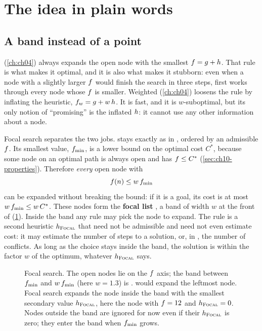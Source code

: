 \section{The idea in plain words}
\label{sec:ch10-intuition}

\subsection{A band instead of a point}

\astar (\cref{ch:ch04}) always expands the open node with the smallest
$f = g + h$. That rule is what makes it optimal, and it is also
what makes it stubborn: even when a node with a slightly larger $f$ would
finish the search in three steps, \astar first works through every node whose
$f$ is smaller. Weighted \astar (\cref{ch:ch04}) loosens the rule by
inflating the heuristic, $f_w = g + w\,h$. It is fast, and it
is $w$-suboptimal, but its only notion of ``promising'' is the inflated
$h$: it cannot use any other information about a node.

Focal search separates the two jobs. \Open stays exactly as in \astar, ordered
by an admissible $f$. Its smallest value, $f_{\min}$, is a lower
bound on the optimal cost $C^*$, because some node on an optimal path is
always open and has $f \le C^*$ (\cref{sec:ch10-properties}). Therefore
\emph{every} open node with
\begin{equation}
  f(n) \le w\,f_{\min}
  \label{eq:ch10-band}
\end{equation}
can be expanded without breaking the bound: if it is a goal, its cost is at
most $w\,f_{\min} \le w\,C^*$. These nodes form the
\textbf{focal list} \Focal, a band of width $w$ at the front
of \Open (\cref{fig:ch10-idea}). Inside the band any rule may pick the node to
expand. The rule is a second heuristic $h_{\textsc{Focal}}$ that need not be
admissible and need not even estimate cost: it may estimate the number of
steps to a solution, or, in \ecbs, the number of conflicts. As long as the
choice stays inside the band, the solution is within the factor $w$ of the
optimum, whatever $h_{\textsc{Focal}}$ says.

\begin{figure}[tb]
  \centering
  \caption{Focal search. The open nodes lie on the $f$ axis; the band
  between $f_{\min}$ and $w\,f_{\min}$ (here $w = 1.3$) is \Focal.
  \astar would expand the leftmost node. Focal search expands the node inside
  the band with the smallest secondary value $h_{\textsc{Focal}}$, here the node
  with $f = 12$ and $h_{\textsc{Focal}} = 0$. Nodes outside the band are
  ignored for now even if their $h_{\textsc{Focal}}$ is zero; they enter the band
  when $f_{\min}$ grows.}
  \label{fig:ch10-idea}
\end{figure}

